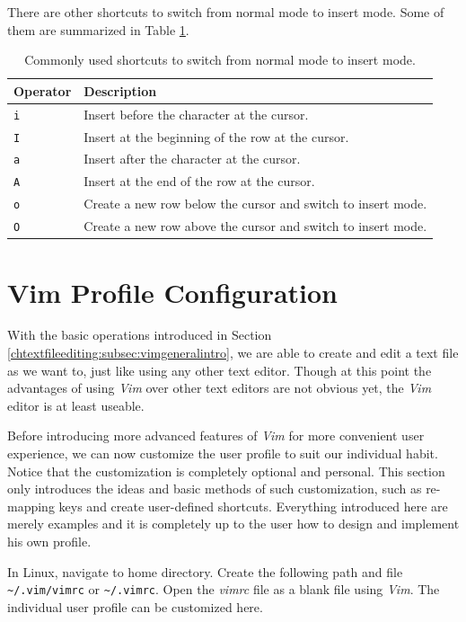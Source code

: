There are other shortcuts to switch from normal mode to insert mode. Some of them are summarized in Table \ref{ch3tab:switchtoinsert}.

\begin{table}
  \centering \caption{Commonly used shortcuts to switch from normal mode to insert mode.}\label{ch3tab:switchtoinsert}
  \begin{tabularx}{\textwidth}{lX}
    \hline
    Operator & Description \\ \hline
    \verb|i| & Insert before the character at the cursor. \\ \hdashline
    \verb|I| & Insert at the beginning of the row at the cursor. \\ \hdashline
    \verb|a| & Insert after the character at the cursor. \\ \hdashline
    \verb|A| & Insert at the end of the row at the cursor. \\ \hdashline
    \verb|o| & Create a new row below the cursor and switch to insert mode. \\ \hdashline
    \verb|O| & Create a new row above the cursor and switch to insert mode. \\
    \hline
  \end{tabularx}
\end{table}

\section{Vim Profile Configuration}

With the basic operations introduced in Section \ref{chtextfileediting:subsec:vimgeneralintro}, we are able to create and edit a text file as we want to, just like using any other text editor. Though at this point the advantages of using \textit{Vim} over other text editors are not obvious yet, the \textit{Vim} editor is at least useable.

Before introducing more advanced features of \textit{Vim} for more convenient user experience, we can now customize the user profile to suit our individual habit. Notice that the customization is completely optional and personal. This section only introduces the ideas and basic methods of such customization, such as re-mapping keys and create user-defined shortcuts. Everything introduced here are merely examples and it is completely up to the user how to design and implement his own profile.

In Linux, navigate to home directory. Create the following path and file \verb|~/.vim/vimrc| or \verb|~/.vimrc|. Open the \textit{vimrc} file as a blank file using \textit{Vim}. The individual user profile can be customized here.

